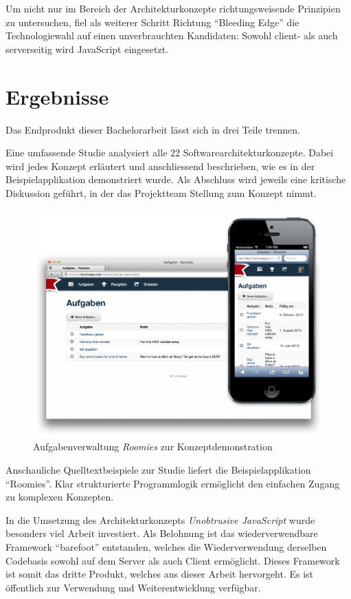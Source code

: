 Um nicht nur im Bereich der Architekturkonzepte richtungsweisende Prinzipien zu untersuchen, fiel als weiterer Schritt Richtung ``Bleeding Edge'' die Technologiewahl auf einen unverbrauchten Kandidaten: Sowohl client- als auch serverseitig wird JavaScript eingesetzt.


\section{Ergebnisse}

Das Endprodukt dieser Bachelorarbeit lässt sich in drei Teile trennen.

Eine umfassende Studie analysiert alle 22 Softwarearchitekturkonzepte. Dabei wird jedes Konzept erläutert und anschliessend beschrieben, wie es in der Beispielapplikation demonstriert wurde. Als Abschluss wird jeweils eine kritische Diskussion geführt, in der das Projektteam Stellung zum Konzept nimmt.

\begin{figure}[H]
	\centering
	\includegraphics[width=12cm]{content/principle-demonstration/images/responsive-screenshots.png}
	\caption{Aufgabenverwaltung \emph{Roomies} zur Konzeptdemonstration}
\end{figure}

Anschauliche Quelltextbeispiele zur Studie liefert die Beispielapplikation ``Roomies''. Klar strukturierte Programmlogik ermöglicht den einfachen Zugang  zu komplexen Konzepten.

In die Umsetzung des Architekturkonzepts \emph{Unobtrusive JavaScript} wurde besonders viel Arbeit investiert. Als Belohnung ist das wiederverwendbare Framework ``barefoot'' entstanden, welches die Wiederverwendung derselben Codebasis sowohl auf dem Server als auch Client ermöglicht. Dieses Framework ist somit das dritte Produkt, welches aus dieser Arbeit hervorgeht. Es ist öffentlich zur Verwendung und Weiterentwicklung verfügbar.



